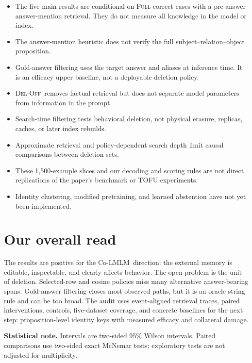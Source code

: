 \documentclass[11pt]{article}
\newcommand{\FULL}{\textsc{Full}}
\newcommand{\DELOFF}{\textsc{Del-Off}}
\newcommand{\colmlm}{Co-LMLM}
\begin{document}
\begin{itemize}
  \item The five main results are conditional on \FULL-correct cases with a
  pre-answer answer-mention retrieval. They do not measure all knowledge in
  the model or index.
  \item The answer-mention heuristic does not verify the full
  subject--relation--object proposition.
  \item Gold-answer filtering uses the target answer and aliases at inference
  time. It is an efficacy upper baseline, not a deployable deletion policy.
  \item \DELOFF\ removes factual retrieval but does not separate model
  parameters from information in the prompt.
  \item Search-time filtering tests behavioral deletion, not physical
  erasure, replicas, caches, or later index rebuilds.
  \item Approximate retrieval and policy-dependent search depth limit causal
  comparisons between deletion sets.
  \item These 1,500-example slices and our decoding and scoring rules are not
  direct replications of the paper's benchmark or TOFU experiments.
  \item Identity clustering, modified pretraining, and learned abstention have
  not yet been implemented.
\end{itemize}

\section{Our overall read}

The results are positive for the \colmlm\ direction: the external memory is
editable, inspectable, and clearly affects behavior. The open problem is the
unit of deletion. Selected-row and cosine policies miss many alternative
answer-bearing spans. Gold-answer filtering closes most observed paths, but
it is an oracle string rule and can be too broad. The audit uses event-aligned
retrieval traces, paired interventions, controls, five-dataset coverage, and
concrete baselines for the next step: proposition-level identity keys with
measured efficacy and collateral damage.

\medskip
\noindent\textbf{Statistical note.} Intervals are two-sided 95\% Wilson
intervals. Paired comparisons use two-sided exact McNemar tests; exploratory
tests are not adjusted for multiplicity.
\end{document}
